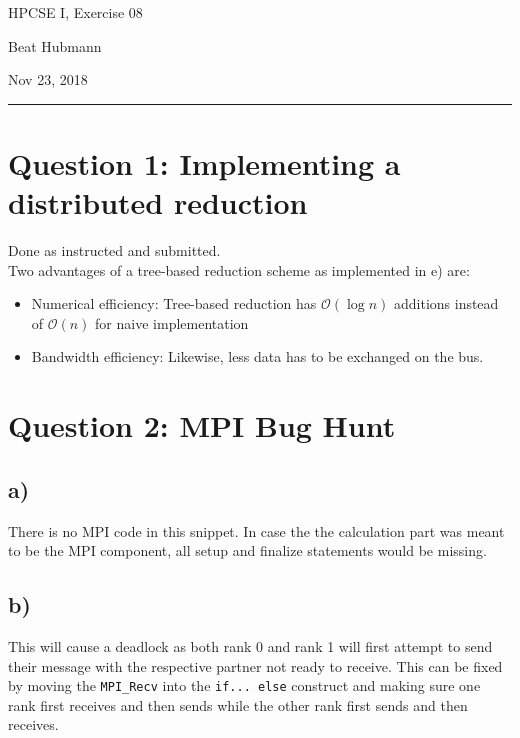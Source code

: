 \documentclass[11pt,a4paper]{article}
\begin{document}
\noindent\parbox{\linewidth}{
 \parbox{.25\linewidth}{ \large HPCSE I, Exercise 08 }\hfill
 \parbox{.5\linewidth}{\begin{center} \large Beat Hubmann \end{center}}\hfill
 \parbox{.2\linewidth}{\begin{flushright} \large Nov 23, 2018 \end{flushright}}
}
\noindent\rule{\linewidth}{2pt}

\section{Question 1: Implementing a distributed reduction}

Done as instructed and submitted. \\
Two advantages of a tree-based reduction scheme as implemented in e) are:
\begin{itemize}
    \item Numerical efficiency: Tree-based reduction has $\mathcal{O}(\log{n})$ additions instead of $\mathcal{O}(n)$ for naive implementation
    \item Bandwidth efficiency: Likewise, less data has to be exchanged on the bus.
\end{itemize}


\section{Question 2: MPI Bug Hunt}

\subsection{a)}
There is no MPI code in this snippet. In case the the calculation part was meant to be the 
MPI component, all setup and finalize statements would be missing.

\subsection{b)}
This will cause a deadlock as both rank 0 and rank 1 will first attempt to send their
message with the respective partner not ready to receive. This can be fixed by moving
the \texttt{MPI\_Recv} into the \texttt{if... else} construct and making sure one rank 
first receives and then sends while the other rank first sends and then receives.
\end{document}

